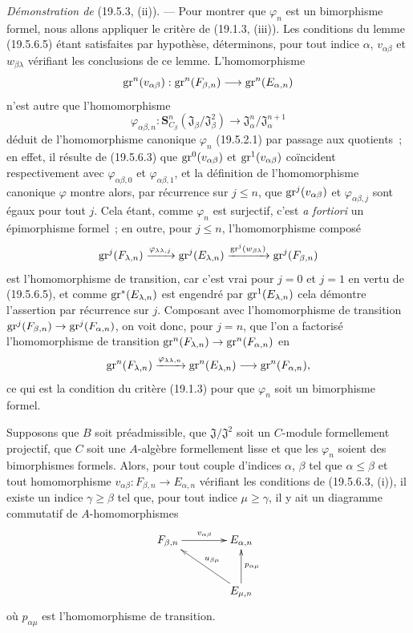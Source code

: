 \begin{env}[19.5.6.6]
\label{0.19.5.6.6-fr}
\emph{Démonstration de} (19.5.3, (ii)). --- Pour montrer que $\varphi_n$ est un
bimorphisme formel, nous allons appliquer le critère de (19.1.3, (iii)). Les
conditions du lemme (19.5.6.5) étant satisfaites par hypothèse, déterminons,
pour tout indice $\alpha$, $v_{\alpha\beta}$ et $w_{\beta\lambda}$ vérifiant
les conclusions de ce lemme. L'homomorphisme
\[
  \operatorname{gr}^n(v_{\alpha\beta}):\operatorname{gr}^n(F_{\beta,n})
  \longrightarrow\operatorname{gr}^n(E_{\alpha,n})
\]
n'est autre que l'homomorphisme
\[
  \varphi_{\alpha\beta,n}:
  \mathbf S_{C_\beta}^n(\mathfrak J_\beta/\mathfrak J_\beta^2)
  \longrightarrow\mathfrak J_\alpha^n/\mathfrak J_\alpha^{n+1}
\]
déduit de l'homomorphisme canonique $\varphi_n$ (19.5.2.1) par passage aux
quotients~; en effet, il résulte de (19.5.6.3) que $\operatorname{gr}^0(v_{\alpha\beta})$ et
$\operatorname{gr}^1(v_{\alpha\beta})$ coïncident respectivement avec
$\varphi_{\alpha\beta,0}$ et $\varphi_{\alpha\beta,1}$, et la définition de
l'homomorphisme canonique $\varphi$ montre alors, par récurrence sur $j\leq n$,
que $\operatorname{gr}^j(v_{\alpha\beta})$ et $\varphi_{\alpha\beta,j}$ sont égaux pour tout
$j$. Cela étant, comme $\varphi_n$ est surjectif, c'est \emph{a fortiori} un
épimorphisme formel~; en outre, pour $j\leq n$, l'homomorphisme composé
\[
  \operatorname{gr}^j(F_{\lambda,n})\xrightarrow{\varphi_{\lambda\lambda,j}}
  \operatorname{gr}^j(E_{\lambda,n})\xrightarrow{\operatorname{gr}^j(w_{\beta\lambda})}
  \operatorname{gr}^j(F_{\beta,n})
\]
est l'homomorphisme de transition, car c'est vrai pour $j=0$ et $j=1$ en
vertu de (19.5.6.5), et comme $\operatorname{gr}^*(E_{\lambda,n})$ est engendré par
$\operatorname{gr}^1(E_{\lambda,n})$ cela démontre l'assertion par récurrence sur $j$.
Composant avec l'homomorphisme de transition
$\operatorname{gr}^j(F_{\beta,n})\to\operatorname{gr}^j(F_{\alpha,n})$, on voit donc, pour $j=n$, que
l'on a factorisé l'homomorphisme de transition
$\operatorname{gr}^n(F_{\lambda,n})\to\operatorname{gr}^n(F_{\alpha,n})$ en
\[
  \operatorname{gr}^n(F_{\lambda,n})\xrightarrow{\varphi_{\lambda\lambda,n}}
  \operatorname{gr}^n(E_{\lambda,n})\longrightarrow\operatorname{gr}^n(F_{\alpha,n}),
\]
ce qui est la condition du critère (19.1.3) pour que $\varphi_n$ soit un
bimorphisme formel.
\end{env}


\begin{lemma}[19.5.6.7]
\label{0.19.5.6.7-fr}
Supposons que $B$ soit préadmissible, que $\mathfrak J/\mathfrak J^2$ soit un
$C$-module formellement projectif, que $C$ soit une $A$-algèbre formellement
lisse et que les $\varphi_n$ soient des bimorphismes formels. Alors, pour tout
couple d'indices $\alpha$, $\beta$ tel que $\alpha\leq\beta$ et tout
homomorphisme $v_{\alpha\beta}:F_{\beta,n}\to E_{\alpha,n}$ vérifiant les
conditions de (19.5.6.3, (i)), il existe un indice $\gamma\geq\beta$ tel que,
pour tout indice $\mu\geq\gamma$, il y ait un diagramme commutatif de
$A$-homomorphismes
\[
\xymatrix@C=4em@R=3em{
  F_{\beta,n}\ar[r]^{v_{\alpha\beta}} & E_{\alpha,n} \\
  & E_{\mu,n}\ar[ul]_{u_{\beta\mu}}\ar[u]_{p_{\alpha\mu}}
}
\]
où $p_{\alpha\mu}$ est l'homomorphisme de transition.
\end{lemma}

